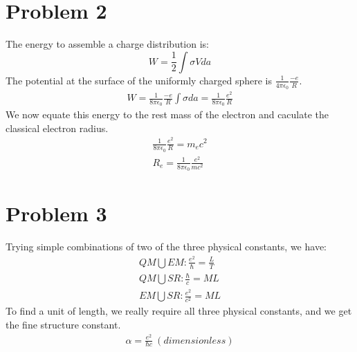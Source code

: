 \documentclass[a4paper,10pt]{article}
\numberwithin{equation}{section}
\begin{document}
\section{Problem 2}
The energy to assemble a charge distribution is:
\begin{equation}
 W=\frac{1}{2} \int \sigma V da
\end{equation}
The potential at the surface of the uniformly charged sphere is $\frac{1}{4\pi \epsilon_0}\frac{-e}{R}$.
\begin{gather}
 W=\frac{1}{8\pi \epsilon_0}\frac{-e}{R}\int \sigma da= \frac{1}{8\pi \epsilon_0}\frac{e^2}{R}
\end{gather}
We now equate this energy to the rest mass of the electron and caculate the classical electron radius.
\begin{gather}
  \frac{1}{8\pi \epsilon_0}\frac{e^2}{R}=m_ec^2\\
  R_e=\frac{1}{8\pi \epsilon_0}\frac{e^2}{mc^2}
\end{gather}

\section{Problem 3}
Trying simple combinations of two of the three physical constants, we have:
\begin{gather}
 QM \bigcup EM: \frac{e^2}{\hbar}=\frac{L}{T}\\
 QM \bigcup SR: \frac{\hbar}{c}=ML\\
 EM \bigcup SR: \frac{e^2}{c^2}=ML
\end{gather}
To find a unit of length, we really require all three physical constants, and we get the fine structure constant.
\begin{gather}
 \alpha = \frac{e^2}{\hbar c} \ (dimensionless)
\end{gather}
\end{document}
